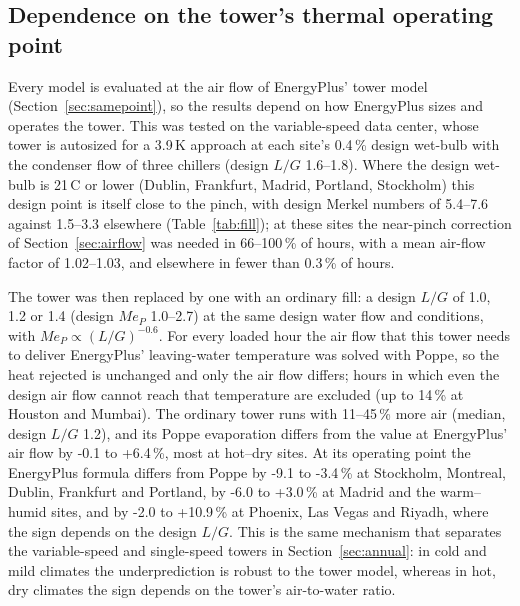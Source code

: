 \documentclass[preprint,12pt]{elsarticle}
\begin{document}
\subsection{Dependence on the tower's thermal operating point}\label{sec:consistency}
Every model is evaluated at the air flow of EnergyPlus' tower model (Section~\ref{sec:samepoint}), so the results depend
on how EnergyPlus sizes and operates the tower. This was tested on the variable-speed data center, whose tower is
autosized for a 3.9\,K approach at each site's 0.4\,\% design wet-bulb with the condenser flow of three chillers (design
$L/G$ 1.6--1.8). Where the design wet-bulb is 21\,\textdegree C or lower (Dublin, Frankfurt, Madrid, Portland, Stockholm)
this design point is itself close to the pinch, with design Merkel numbers of 5.4--7.6 against 1.5--3.3 elsewhere
(Table~\ref{tab:fill}); at these sites the near-pinch correction of Section~\ref{sec:airflow} was needed in 66--100\,\% of
hours, with a mean air-flow factor of 1.02--1.03, and elsewhere in fewer than 0.3\,\% of hours.

The tower was then replaced by one with an ordinary fill: a design $L/G$ of 1.0, 1.2 or 1.4 (design $Me_P$ 1.0--2.7) at the
same design water flow and conditions, with $Me_P\propto(L/G)^{-0.6}$. For every loaded hour the air flow that this tower
needs to deliver EnergyPlus' leaving-water temperature was solved with Poppe, so the heat rejected is unchanged and only
the air flow differs; hours in which even the design air flow cannot reach that temperature are excluded (up to 14\,\% at
Houston and Mumbai). The ordinary tower runs with 11--45\,\% more air (median, design $L/G$ 1.2), and its Poppe evaporation
differs from the value at EnergyPlus' air flow by -0.1 to +6.4\,\%, most at hot--dry sites. At its operating point the
EnergyPlus formula differs from Poppe by -9.1 to -3.4\,\% at Stockholm, Montreal, Dublin, Frankfurt and Portland, by
-6.0 to +3.0\,\% at Madrid and the warm--humid sites, and by -2.0 to +10.9\,\% at Phoenix, Las Vegas and Riyadh, where the
sign depends on the design $L/G$. This is the same mechanism that separates the variable-speed and single-speed towers in
Section~\ref{sec:annual}: in cold and mild climates the underprediction is robust to the tower model, whereas in hot, dry
climates the sign depends on the tower's air-to-water ratio.

\begin{table}[t]\centering\scriptsize
\caption{Variable-speed data center: design point of the EnergyPlus tower and the ordinary-fill check (sites sorted by
mean wet-bulb). $T_{wb,d}$: design wet-bulb; $Me_{P,d}$: Poppe Merkel number at the design point; corr.: share of loaded
hours with the near-pinch air-flow correction; EP vs P: EnergyPlus saturated exit vs Poppe annual evaporation. Ordinary
fill: design $L/G$ = 1.2, and range over design $L/G$ = 1.0--1.4; P shift: Poppe evaporation with the ordinary fill vs
EnergyPlus' air flow; capped: hours excluded because the ordinary tower cannot reach EnergyPlus' leaving-water
temperature.}\label{tab:fill}
\resizebox{\linewidth}{!}{}
\end{table}
\end{document}
